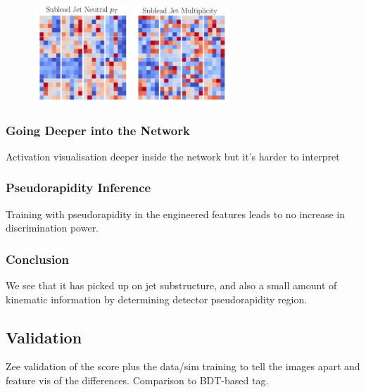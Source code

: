 \begin{figure}[h!]
\begin{center}
        \includegraphics[width=0.32\textwidth]{figures/event_selection/front_filters_channel_4.pdf}
        \includegraphics[width=0.32\textwidth]{figures/event_selection/front_filters_channel_5.pdf}
    \end{center}
    \caption{}
    \label{fig:event_categorisation:front_filters}
\end{figure}

\subsubsection{Going Deeper into the Network}
Activation visualisation deeper inside the network but it's harder to interpret

\subsubsection{Pseudorapidity Inference}
Training with pseudorapidity in the engineered features leads to no increase in discrimination power. 

\subsubsection{Conclusion}
We see that it has picked up on jet substructure, and also a small amount of kinematic information by determining detector pseudorapidity region. 




\subsection{Validation}
Zee validation of the score plus the data/sim training to tell the images apart and feature vis of the differences. Comparison to BDT-based tag. 




